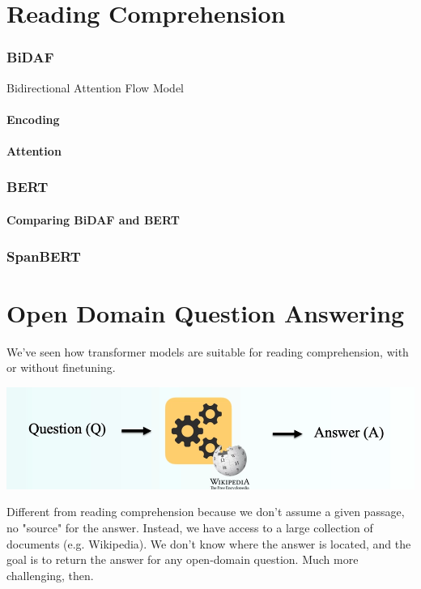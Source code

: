 \documentclass[10pt]{report}
\begin{document}
\section{Reading Comprehension}
\subsubsection{BiDAF} Bidirectional Attention Flow Model
\paragraph{Encoding} %
\paragraph{Attention} %
\subsubsection{BERT}
\paragraph{Comparing BiDAF and BERT}
\subsubsection{SpanBERT}
\section{Open Domain Question Answering}
We've seen how transformer models are suitable for reading comprehension, with or without finetuning.
\begin{center}
	\includegraphics[scale=0.5]{95.png}
\end{center}
Different from reading comprehension because we don't assume a given passage, no "source" for the answer. Instead, we have access to a large collection of documents (e.g. Wikipedia). We don't know where the answer is located, and the goal is to return the answer for any open-domain question. Much more challenging, then.
\end{document}
